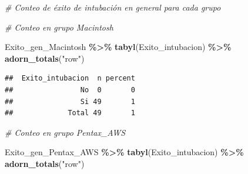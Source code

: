\documentclass[
]{article}
\newenvironment{Shaded}{\begin{snugshade}}{\end{snugshade}}
\newcommand{\CommentTok}[1]{\textcolor[rgb]{0.56,0.35,0.01}{\textit{#1}}}
\newcommand{\FunctionTok}[1]{\textcolor[rgb]{0.13,0.29,0.53}{\textbf{#1}}}
\newcommand{\NormalTok}[1]{#1}
\newcommand{\OtherTok}[1]{\textcolor[rgb]{0.56,0.35,0.01}{#1}}
\newcommand{\SpecialCharTok}[1]{\textcolor[rgb]{0.81,0.36,0.00}{\textbf{#1}}}
\newcommand{\StringTok}[1]{\textcolor[rgb]{0.31,0.60,0.02}{#1}}
\begin{document}
\begin{Shaded}
\end{Shaded}

\begin{Shaded}
\begin{Highlighting}[]
\CommentTok{\# Conteo de éxito de intubación en general para cada grupo}

\CommentTok{\# Conteo en grupo Macintosh}

\NormalTok{Exito\_gen\_Macintosh }\SpecialCharTok{\%\textgreater{}\%}  
  \FunctionTok{tabyl}\NormalTok{(Exito\_intubacion) }\SpecialCharTok{\%\textgreater{}\%} 
  \FunctionTok{adorn\_totals}\NormalTok{(}\StringTok{"row"}\NormalTok{)}
\end{Highlighting}
\end{Shaded}

\begin{verbatim}
##  Exito_intubacion  n percent
##                No  0       0
##                Si 49       1
##             Total 49       1
\end{verbatim}

\begin{Shaded}
\begin{Highlighting}[]
\CommentTok{\# Conteo en grupo Pentax\_AWS}

\NormalTok{Exito\_gen\_Pentax\_AWS }\SpecialCharTok{\%\textgreater{}\%} 
  \FunctionTok{tabyl}\NormalTok{(Exito\_intubacion) }\SpecialCharTok{\%\textgreater{}\%} 
  \FunctionTok{adorn\_totals}\NormalTok{(}\StringTok{"row"}\NormalTok{)}
\end{Highlighting}
\end{Shaded}
\end{document}
